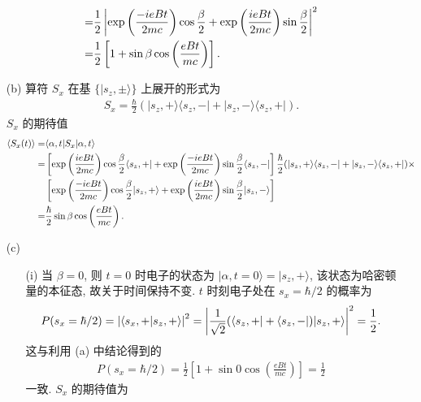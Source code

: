 \documentclass{assignment}
\begin{document}
\begin{sol}
\begin{itemize}
\begin{align}
            \notag=&\frac{1}{2}\left\lvert\exp\left(\frac{-ieBt}{2mc}\right)\cos\frac{\beta}{2}+\exp\left(\frac{ieBt}{2mc}\right)\sin\frac{\beta}{2}\right\rvert^2\\
            =&\frac{1}{2}\left[1+\sin\beta\cos\left(\frac{eBt}{mc}\right)\right].
        \end{align}
        \item[(b)] 算符 $S_x$ 在基 $\{\lvert s_z,\pm\rangle\}$ 上展开的形式为
        \begin{align}
            S_x=\frac{\hbar}{2}(\lvert s_z,+\rangle\langle s_z,-\rvert+\lvert s_z,-\rangle\langle s_z,+\rvert).
        \end{align}
        $S_x$ 的期待值
        \begin{align}
            \notag\langle S_x(t)\rangle=&\langle\alpha,t\rvert S_x\lvert\alpha,t\rangle\\
            \notag=&\left[\exp\left(\frac{ieBt}{2mc}\right)\cos\frac{\beta}{2}\langle s_z,+\rvert+\exp\left(\frac{-ieBt}{2mc}\right)\sin\frac{\beta}{2}\langle s_z,-\rvert\right]\frac{\hbar}{2}(\lvert s_z,+\rangle\langle s_z,-\rvert+\lvert s_z,-\rangle\langle s_z,+\rvert)\times\\
            \notag&\left[\exp\left(\frac{-ieBt}{2mc}\right)\cos\frac{\beta}{2}\lvert s_z,+\rangle+\exp\left(\frac{ieBt}{2mc}\right)\sin\frac{\beta}{2}\lvert s_z,-\rangle\right]\\
            =&\frac{\hbar}{2}\sin\beta\cos\left(\frac{eBt}{mc}\right).
        \end{align}
        \item[(c)] 
        \begin{itemize}
            \item[(i)] 当 $\beta=0$, 则 $t=0$ 时电子的状态为 $\lvert\alpha,t=0\rangle=\lvert s_z,+\rangle$, 该状态为哈密顿量的本征态, 故关于时间保持不变. $t$ 时刻电子处在 $s_x=\hbar/2$ 的概率为
            \begin{align}
                P(s_x=\hbar/2)=\left\lvert\langle s_x,+\vert s_z,+\rangle\right\rvert^2=\left\lvert\frac{1}{\sqrt{2}}(\langle s_z,+\rvert+\langle s_z,-\rvert)\lvert s_z,+\rangle\right\rvert^2=\frac{1}{2}.
            \end{align}
            这与利用 (a) 中结论得到的
            \begin{align}
                P(s_x=\hbar/2)=\frac{1}{2}\left[1+\sin 0\cos\left(\frac{eBt}{mc}\right)\right]=\frac{1}{2}
            \end{align}
            一致.
            $S_x$ 的期待值为
            \begin{align}

\end{align}
\end{itemize}
\end{itemize}
\end{sol}
\end{document}
